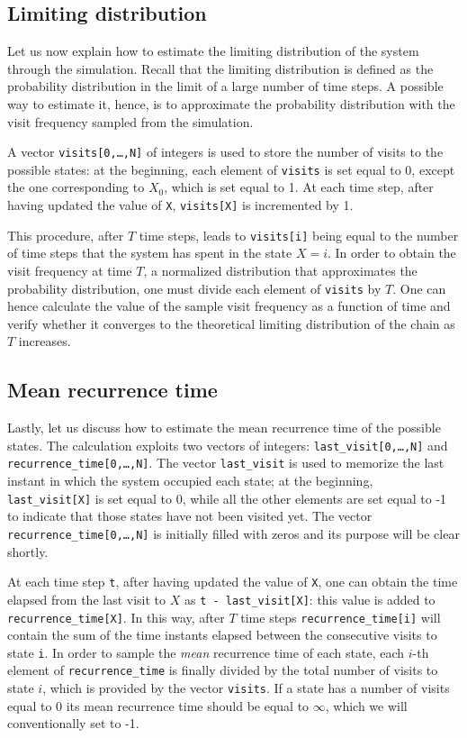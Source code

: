 \subsection{Limiting distribution}
Let us now explain how to estimate the limiting distribution of the system through the simulation. Recall that the limiting distribution is defined as the probability distribution in the limit of a large number of time steps. A possible way to estimate it, hence, is to approximate the probability distribution  with the visit frequency sampled from the simulation. 

A vector \texttt{visits[0,\dots,N]} of integers is used to store the number of visits to the possible states: at the beginning, each element of \texttt{visits} is set equal to 0, except the one corresponding to $X_0$, which is set equal to 1.  At each time step, after having updated the value of \texttt{X}, \texttt{visits[X]} is incremented by 1. 

This procedure, after $T$ time steps, leads to \texttt{visits[i]} being equal to the number of time steps that the system has spent in the state $X = i$. In order to obtain the visit frequency at time $T$, \ie a normalized distribution that approximates the probability distribution, one must divide each element of \texttt{visits} by $T$. One can hence calculate the value of the sample visit frequency as a function of time and verify whether it converges to the theoretical limiting distribution of the chain as $T$ increases.

\subsection{Mean recurrence time}
Lastly, let us discuss how to estimate the mean recurrence time of the possible states. The calculation exploits two vectors of integers: \texttt{last\_visit[0,\dots,N]} and \texttt{recurrence\_time[0,\dots,N]}. The vector \texttt{last\_visit} is used to memorize the last instant in which the system occupied each state; at the beginning, \texttt{last\_visit[X]} is set equal to 0, while all the other elements are set equal to -1 to indicate that those states have not been visited yet. The vector \texttt{recurrence\_time[0,\dots,N]} is initially filled with zeros and its purpose will be clear shortly.

At each time step \texttt{t}, after having updated the value of \texttt{X}, one can obtain the time elapsed from the last visit to $X$ as \texttt{t - last\_visit[X]}: this value is added to \texttt{recurrence\_time[X]}. In this way, after $T$ time steps \texttt{recurrence\_time[i]} will contain the sum of the time instants elapsed between the consecutive visits to state \texttt{i}. In order to sample the \emph{mean} recurrence time of each state, each $i$-th element of \texttt{recurrence\_time} is finally divided by the total number of visits to state $i$, which is provided by the vector \texttt{visits}. If a state has a number of visits equal to 0 its mean recurrence time should be equal to $\infty$, which we will conventionally set to -1. 

